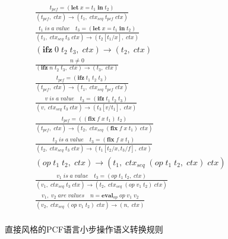 \begin{figure}[t]
    \centering
    \setlength{\jot}{10pt}
    \begin{gather*}
        \tag*{ps\_let\_app} \displaystyle{\frac{t_{pcf}=(\mathbf{let}\; x = t_1\; \mathbf{in}\; t_2)} {(t_{pcf},\; ctx)\rightarrow (t_1,\; ctx_{seq}\; t_{pcf}\; ctx)}} \\
        \tag*{ps\_let\_abs} \displaystyle{\frac{t_1\; is\; a\; value\quad t_3=(\mathbf{let}\; x = t_1\; \mathbf{in}\; t_2)} {(t_1,\; ctx_{seq}\; t_3\; ctx)\rightarrow (t_2 [t_1/x],\; ctx)}} \\
        \tag*{ps\_if\_zero} \displaystyle{(\mathbf{ifz}\; 0\; t_2\; t_3,\; ctx)\rightarrow (t_2,\; ctx)} \\
        \tag*{ps\_if\_notzero} \displaystyle{\frac{n \neq 0}{(\mathbf{ifz}\; n\; t_2\; t_3,\; ctx)\rightarrow (t_3,\; ctx)}} \\
        \tag*{ps\_if\_app} \displaystyle{\frac{t_{pcf}=(\mathbf{ifz}\; t_1\; t_2\; t_3)} {(t_{pcf},\; ctx)\rightarrow (t_1,\; ctx_{seq}\; t_{pcf}\; ctx)}} \\
        \tag*{ps\_if\_abs} \displaystyle{\frac{v\; is\; a\; value\quad t_3=(\mathbf{ifz}\; t_1\; t_2\; t_3)} {(v,\; ctx_{seq}\; t_3\; ctx)\rightarrow (t_3 [v/t_1],\; ctx)}} \\
        \tag*{ps\_fix\_app} \displaystyle{\frac{t_{pcf}=((\mathbf{fix}\; f\; x\; t_1)\; t_2)} {(t_{pcf},\; ctx)\rightarrow (t_2,\; ctx_{seq}\; (\mathbf{fix}\; f\; x\; t_1)\; ctx)}} \\
        \tag*{ps\_fix\_abs} \displaystyle{\frac{t_2\; is\; a\; value\quad t_3=(\mathbf{fix}\; f\; x\; t_1)} {(t_2,\; ctx_{seq}\; t_3\; ctx)\rightarrow (t_1 [t_2/x,t_3/f],\; ctx)}} \\
        \tag*{ps\_op\_fst} \displaystyle{(op\; t_1\; t_2,\; ctx)\rightarrow (t_1,\; ctx_{seq}\; (op\; t_1\; t_2,\; ctx)\; ctx)} \\
        \tag*{ps\_op\_snd} \displaystyle{\frac{v_1\; is\; a\; value\quad t_3=(op\; t_1\; t_2,\; ctx)} {(v_1,\; ctx_{seq}\; t_3\; ctx)\rightarrow (t_2,\; ctx_{seq}\; (op\; v_1\; t_2)\; ctx)}} \\
        \tag*{ps\_op\_cal} \displaystyle{\frac{v_1,\; v_2\; are\; values\quad n=\mathbf{eval}_{op}\; op\; v_1\; v_2}{(v_2,\; ctx_{seq}\; (op\; v_1\; t_2)\; ctx)\rightarrow (n,\; ctx)}} \\
    \end{gather*}  
    \caption{直接风格的PCF语言小步操作语义转换规则} \label{pcfopsem}
\end{figure}


